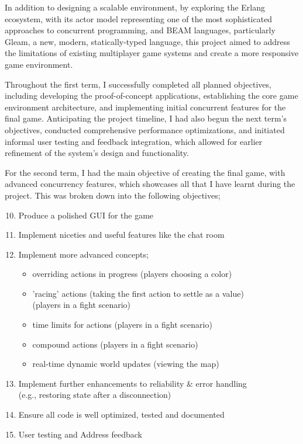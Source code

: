 \documentclass[]{final}
\begin{document}
In addition to designing a scalable environment,
by exploring the Erlang ecosystem, with its actor model representing one of the
most sophisticated approaches to concurrent programming, and
BEAM languages, particularly Gleam, a new, modern, statically-typed language,
this project aimed to address the limitations of existing multiplayer
game systems and create a more responsive game environment.

Throughout the first term, I successfully completed all planned objectives,
including developing the proof-of-concept applications,
establishing the core game environment architecture, and implementing initial
concurrent features for the final game. Anticipating the project timeline,
I had also begun the next term's objectives, conducted comprehensive performance
optimizations, and initiated informal user testing and feedback integration,
which allowed for earlier refinement of the system's design and functionality.

For the second term, I had the main objective of creating the final game, with
advanced concurrency features, which showcases all that I have learnt during the
project. This was broken down into the following objectives;

\begin{enumerate}
  \setcounter{enumi}{9}
  \item Produce a polished GUI for the game
  \item Implement niceties and useful features like the chat room
  \item Implement more advanced concepts;
        \begin{itemize}
          \item overriding actions in progress (players choosing a color)
          \item 'racing' actions (taking the first action to settle as a value)\\(players in a fight scenario)
          \item time limits for actions (players in a fight scenario)
          \item compound actions (players in a fight scenario)
          \item real-time dynamic world updates (viewing the map)
        \end{itemize}
  \item Implement further enhancements to reliability \& error handling\\(e.g., restoring state after a disconnection)
  \item Ensure all code is well optimized, tested and documented
  \item User testing and Address feedback
\end{enumerate}
\end{document}
